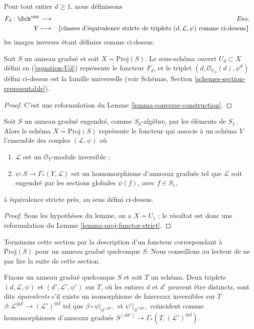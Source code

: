 \medskip\noindent
Pour tout entier $d \geq 1$, nous définissons
\begin{eqnarray*}
F_d : \Sch^{opp} & \longrightarrow & \textit{Ens}, \\
Y & \longmapsto &
\{\text{classes d'équivalence stricte de triplets }
(d, \mathcal{L}, \psi)
\text{ comme ci-dessus}\}
\end{eqnarray*}
les images inverses étant définies comme ci-dessus.

\begin{lemma}
\label{lemma-proj-functor-strict}
Soit $S$ un anneau gradué et soit $X = \text{Proj}(S)$. Le sous-schéma ouvert
$U_d \subset X$ défini en (\ref{equation-Ud}) représente le foncteur $F_d$,
et le triplet $(d, \mathcal{O}_{U_d}(d), \psi^d)$ défini ci-dessus est la
famille universelle (voir Schémas,
Section \ref{schemes-section-representable}).
\end{lemma}

\begin{proof}
C'est une reformulation du Lemme \ref{lemma-converse-construction}.
\end{proof}

\begin{lemma}
\label{lemma-apply}
Soit $S$ un anneau gradué engendré, comme $S_0$-algèbre, par les éléments de
$S_1$. Alors le schéma $X = \text{Proj}(S)$ représente le foncteur qui associe
à un schéma $Y$ l'ensemble des couples $(\mathcal{L}, \psi)$ où
\begin{enumerate}
\item $\mathcal{L}$ est un $\mathcal{O}_Y$-module inversible ;
\item $\psi : S \to \Gamma_*(Y, \mathcal{L})$ est un homomorphisme d'anneaux
gradués tel que $\mathcal{L}$ soit engendré par les sections globales
$\psi(f)$, avec $f \in S_1$,
\end{enumerate}
à équivalence stricte près, au sens défini ci-dessus.
\end{lemma}

\begin{proof}
Sous les hypothèses du lemme, on a $X = U_1$ ; le résultat est donc une
reformulation du Lemme \ref{lemma-proj-functor-strict}.
\end{proof}

\noindent
Terminons cette section par la description d'un foncteur correspondant à
$\text{Proj}(S)$ pour un anneau gradué quelconque $S$. Nous conseillons au
lecteur de ne pas lire la suite de cette section.

\medskip\noindent
Fixons un anneau gradué quelconque $S$ et soit $T$ un schéma. Deux triplets
$(d, \mathcal{L}, \psi)$ et $(d', \mathcal{L}', \psi')$ sur $T$, où les
entiers $d$ et $d'$ peuvent être distincts, sont dits {\it équivalents} s'il
existe un isomorphisme de faisceaux inversibles sur $T$
$\beta : \mathcal{L}^{\otimes d'} \to (\mathcal{L}')^{\otimes d}$ tel que
$\beta \circ \psi|_{S^{(dd')}}$ et $\psi'|_{S^{(dd')}}$ coïncident comme
homomorphismes d'anneaux gradués
$S^{(dd')} \to \Gamma_*(T, (\mathcal{L}')^{\otimes d})$.

